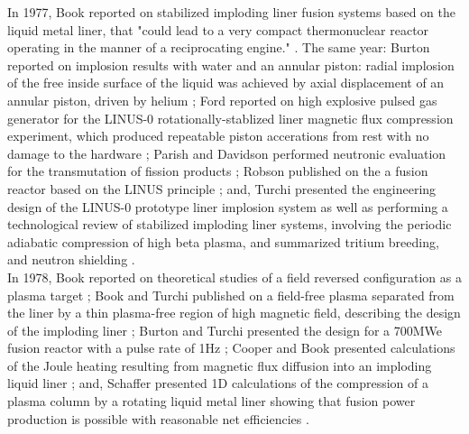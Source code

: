 In 1977, Book reported on stabilized imploding liner fusion systems based on the liquid metal liner, that "could lead to a very compact thermonuclear reactor operating in the manner of a reciprocating engine." \cite{Book1977}. The same year: Burton reported on implosion results with water and an annular piston: radial implosion of the free inside surface of the liquid was achieved by axial displacement of an annular piston, driven by helium \cite{Burton1978};  Ford reported on high explosive pulsed gas generator for the LINUS-0 rotationally-stablized liner magnetic flux compression experiment, which produced repeatable piston accerations from rest with no damage to the hardware \cite{Ford1977};  Parish and Davidson performed neutronic evaluation for the transmutation of fission products \cite{Parish1977}; Robson published on the a fusion reactor based on the LINUS principle \cite{Robson1977}; and, Turchi presented the engineering design of the LINUS-0 prototype liner implosion system \cite{Turchi1977} as well as performing a technological review of stabilized imploding liner systems, involving the periodic adiabatic compression of high beta plasma, and summarized tritium breeding, and neutron shielding \cite{Turchi1977a}.  \\

In 1978, Book reported on theoretical studies of a field reversed configuration as a plasma target \cite{Book1978}; Book and Turchi published on a field-free plasma separated from the liner by a thin plasma-free region of high magnetic field, describing the design of the imploding liner \cite{Book1978a}; Burton and Turchi presented the design for a 700MWe fusion reactor with a pulse rate of 1Hz \cite{Burton1978}; Cooper and Book presented calculations of the Joule heating resulting from magnetic flux diffusion into an imploding liquid liner \cite{Cooper1978}; and, Schaffer presented 1D calculations of the compression of a plasma column by a rotating liquid metal liner showing that fusion power production is possible with reasonable net efficiencies \cite{Schaffer1978}.\\


